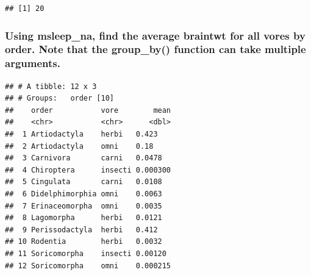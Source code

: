 \documentclass[]{book}
\begin{document}
\begin{verbatim}
## [1] 20
\end{verbatim}

\hypertarget{using-msleep_na-find-the-average-braintwt-for-all-vores-by-order.-note-that-the-group_by-function-can-take-multiple-arguments.}{%
\subsubsection{Using msleep\_na, find the average braintwt for all vores by order. Note that the group\_by() function can take multiple arguments.}\label{using-msleep_na-find-the-average-braintwt-for-all-vores-by-order.-note-that-the-group_by-function-can-take-multiple-arguments.}}

\begin{verbatim}
## # A tibble: 12 x 3
## # Groups:   order [10]
##    order           vore        mean
##    <chr>           <chr>      <dbl>
##  1 Artiodactyla    herbi   0.423   
##  2 Artiodactyla    omni    0.18    
##  3 Carnivora       carni   0.0478  
##  4 Chiroptera      insecti 0.000300
##  5 Cingulata       carni   0.0108  
##  6 Didelphimorphia omni    0.0063  
##  7 Erinaceomorpha  omni    0.0035  
##  8 Lagomorpha      herbi   0.0121  
##  9 Perissodactyla  herbi   0.412   
## 10 Rodentia        herbi   0.0032  
## 11 Soricomorpha    insecti 0.00120 
## 12 Soricomorpha    omni    0.000215
\end{verbatim}


\end{document}
